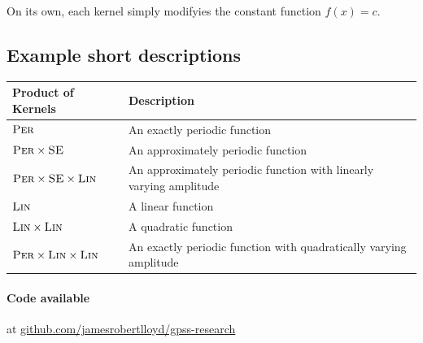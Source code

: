 \documentclass[landscape,a0b,final,a4resizeable]{a0poster}
\newenvironment{poster}{
  \begin{center}
  \begin{minipage}[c]{0.96\textwidth}
}{
  \end{minipage} 
  \end{center}
}
\begin{document}
\begin{poster}
\begin{multicols}{3}
\vspace{1\baselineskip}

On its own, each kernel simply modifyies the constant function $f(x) = c$.



\subsection*{Example short descriptions}

\centering
\begin{tabular}{l|l}
Product of Kernels & Description \\
\midrule
${\textsc{Per}}$ & An exactly periodic function \\
${\textsc{Per}} \times {\textsc{SE}}$ & An approximately periodic function \\
${\textsc{Per}} \times {\textsc{SE}} \times {\textsc{Lin}}$ & An approximately periodic function with linearly varying amplitude \\
${\textsc{Lin}}$ & A linear function \\
${\textsc{Lin}} \times {\textsc{Lin}}$ & A quadratic function \\
${\textsc{Per}} \times {\textsc{Lin}} \times {\textsc{Lin}}$ & An exactly periodic function with quadratically varying amplitude\\
\end{tabular}

\vspace{1\baselineskip}

\raggedright
\paragraph{Code available} at \url{github.com/jamesrobertlloyd/gpss-research}

\end{multicols}

\end{poster}
\end{document}
